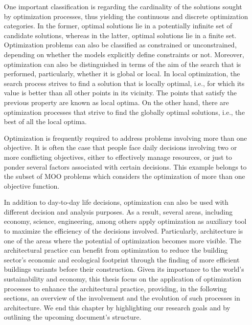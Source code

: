 	One important classification is regarding the cardinality of the solutions sought by optimization processes, thus yielding the continuous and discrete optimization categories. In the former, optimal solutions lie in a potentially infinite set of candidate solutions, whereas in the latter, optimal solutions lie in a finite set. Optimization problems can also be classified as constrained or unconstrained, depending on whether the models explicitly define constraints or not. Moreover, optimization can also be distinguished in terms of the aim of the search that is performed, particularly, whether it is global or local. In local optimization, the search process strives to find a solution that is locally optimal, i.e., for which its value is better than all other points in its vicinity. The points that satisfy the previous property are known as local optima. On the other hand, there are optimization processes that strive to find the globally optimal solutions, i.e., the best of all the local optima.

	Optimization is frequently required to address problems involving more than one objective. It is often the case that people face daily decisions involving two or more conflicting objectives, either to effectively manage resources, or just to ponder several factors associated with certain decisions.  This example belongs to the subset of \ac{MOO} problems which considers the optimization of more than one objective function. 

	In addition to day-to-day life decisions, optimization can also be used with different decision and analysis purposes. As a result, several areas, including economy, science, engineering, among others apply optimization as auxiliary tool to maximize the efficiency of the decisions involved. Particularly, architecture is one of the areas where the potential of optimization becomes more visible. The architectural practice can benefit from optimization to reduce the building sector's economic and ecological footprint through the finding of more efficient buildings variants before their construction. Given its importance to the world's sustainability and economy, this thesis focus on the application of optimization processes to enhance the architectural practice, providing, in the following sections, an overview of the involvement and the evolution of such processes in architecture. We end this chapter by highlighting our research goals and by outlining the upcoming document's structure.


